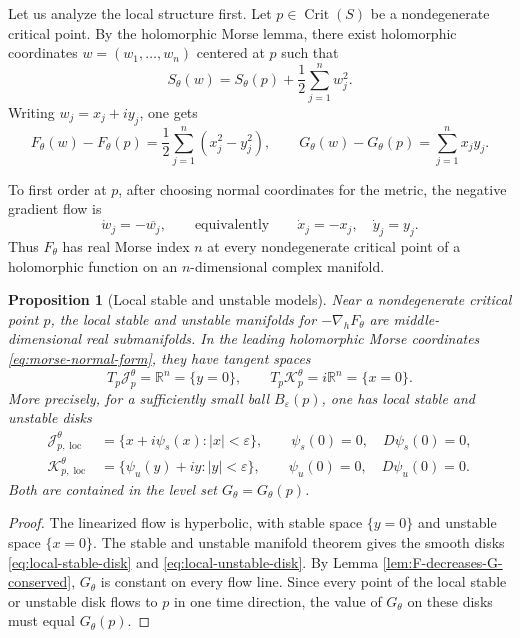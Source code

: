 \documentclass[11pt]{amsart}
\theoremstyle{plain}
\newtheorem{prop}[thm]{Proposition}
\newcommand{\R}{\mathbb R}
\newcommand{\Crit}{\operatorname{Crit}}
\newcommand{\J}{\mathcal J}
\begin{document}
Let us analyze the local structure first. Let $p\in\Crit(S)$ be a nondegenerate critical point. By the holomorphic Morse lemma, there exist holomorphic coordinates $w=(w_1,\dots,w_n)$ centered at $p$ such that
\begin{equation}\label{eq:morse-normal-form}
S_{\theta}(w)=S_{\theta}(p)+\frac12\sum_{j=1}^n w_j^2.
\end{equation}
Writing $w_j=x_j+iy_j$, one gets
\begin{equation*}\label{eq:local-FG}
F_{\theta}(w)-F_{\theta}(p)
=\frac12\sum_{j=1}^n(x_j^2-y_j^2),
\qquad
G_{\theta}(w)-G_{\theta}(p)
=\sum_{j=1}^n x_jy_j.
\end{equation*}


To first order at $p$, after choosing normal coordinates for the metric, the negative gradient flow is
\begin{equation}\label{eq:linear-local-flow}
\dot w_j=-\overline{w_j},
\qquad\text{equivalently}\qquad
\dot x_j=-x_j,
\quad
\dot y_j=y_j.
\end{equation}
Thus $F_{\theta}$ has real Morse index $n$ at every nondegenerate critical point of a holomorphic function on an $n$-dimensional complex manifold.

\begin{prop}[Local stable and unstable models]\label{prop:local-model}
Near a nondegenerate critical point $p$, the local stable and unstable manifolds for $-\nabla_h F_{\theta}$ are middle-dimensional real submanifolds.  In the leading holomorphic Morse coordinates \eqref{eq:morse-normal-form}, they have tangent spaces
\begin{equation*}\label{eq:local-tangent-model}
T_p\J_p^\theta=\R^n=\{y=0\},
\qquad
T_p\mathcal{K}_p^\theta=i\R^n=\{x=0\}.
\end{equation*}
More precisely, for a sufficiently small ball $B_\varepsilon(p)$, one has local stable and unstable disks
\begin{align}
\J_{p,\operatorname{loc}}^\theta
&=\{x+i\psi_s(x): |x|<\varepsilon\},
\qquad \psi_s(0)=0,
\quad D\psi_s(0)=0,\label{eq:local-stable-disk}\\
\mathcal{K}_{p,\operatorname{loc}}^\theta
&=\{\psi_u(y)+iy: |y|<\varepsilon\},
\qquad \psi_u(0)=0,
\quad D\psi_u(0)=0.\label{eq:local-unstable-disk}
\end{align}
Both are contained in the level set $G_{\theta}=G_{\theta}(p)$.
\end{prop}

\begin{proof}
The linearized flow is hyperbolic, with stable space $\{y=0\}$ and unstable space $\{x=0\}$.  The stable and unstable manifold theorem gives the smooth disks \eqref{eq:local-stable-disk} and \eqref{eq:local-unstable-disk}.  By Lemma \ref{lem:F-decreases-G-conserved}, $G_{\theta}$ is constant on every flow line.  Since every point of the local stable or unstable disk flows to $p$ in one time direction, the value of $G_{\theta}$ on these disks must equal $G_{\theta}(p)$.
\end{proof}
\end{document}
